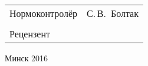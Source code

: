 \begin{titlepage}
\begin{center}
\begin{tabular}{ p{}p{} }
      Нормоконтролёр & С.\,В.~Болтак\\
      & \\
      Рецензент &
    \end{tabular}
    
    \vfill
    {\normalsize Минск 2016}
  \end{center}
\end{titlepage}
